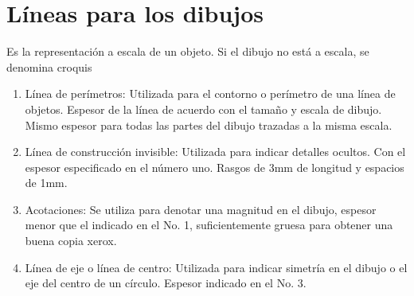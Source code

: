 \section{Líneas para los dibujos}
\begin{definition}[Plano]
	Es la representación a escala de un objeto. Si el dibujo no está a escala, se denomina croquis
\end{definition}
\begin{enumerate}
	\item Línea de perímetros: Utilizada para el contorno o perímetro de una línea de objetos. Espesor de la línea de acuerdo con el tamaño y escala de dibujo. Mismo espesor para todas las partes del dibujo trazadas a la misma escala.
	      \begin{center}
	      \end{center}
	\item Línea de construcción invisible: Utilizada para indicar detalles ocultos. Con el espesor especificado en el número uno. Rasgos de 3mm de longitud y espacios de 1mm.
	      \begin{center}
	      \end{center}
	\item Acotaciones: Se utiliza para denotar una magnitud en el dibujo, espesor menor que el indicado en el No. 1, suficientemente gruesa para obtener una buena copia xerox.
	      \begin{center}
	      \end{center}

	\item Línea de eje o línea de centro: Utilizada para indicar simetría en el dibujo o el eje del centro de un círculo. Espesor indicado en el No. 3.
	      \begin{center}
	      \end{center}


\end{enumerate}
